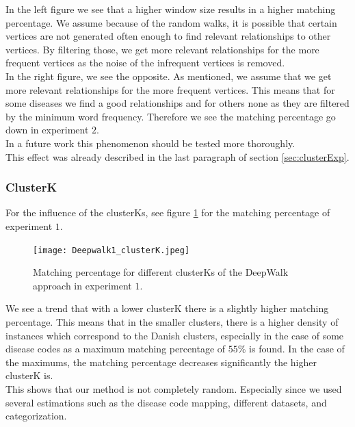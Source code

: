 In the left figure we see that a higher window size results in a higher matching percentage. We assume because of the random walks, it is possible that certain vertices are not generated often enough to find relevant relationships to other vertices. By filtering those, we get more relevant relationships for the more frequent vertices as the noise of the infrequent vertices is removed. \\

In the right figure, we see the opposite. As mentioned, we assume that we get more relevant relationships for the more frequent vertices. This means that for some diseases we find a good relationships and for others none as they are filtered by the minimum word frequency. Therefore we see the matching percentage go down in experiment $2$. \\
In a future work this phenomenon should be tested more thoroughly. \\

This effect was already described in the last paragraph of section \ref{sec:clusterExp}.

\subsubsection{ClusterK}

For the influence of the clusterKs, see figure \ref{fig:dw_clusterK_1} for the matching percentage of experiment $1$. \\

\begin{figure}[!htb]
	\centering
	\texttt{[image: Deepwalk1\_clusterK.jpeg]}
	\caption{Matching percentage for different clusterKs of the DeepWalk approach in experiment $1$.}
	\label{fig:dw_clusterK_1}
\end{figure}

\noindent We see a trend that with a lower clusterK there is a slightly higher matching percentage. This means that in the smaller clusters, there is a higher density of instances which correspond to the Danish clusters, especially in the case of some disease codes as a maximum matching percentage of $55$\% is found. In the case of the maximums, the matching percentage decreases significantly the higher clusterK is. \\
This shows that our method is not completely random. Especially since we used several estimations such as the disease code mapping, different datasets, and categorization. \\

